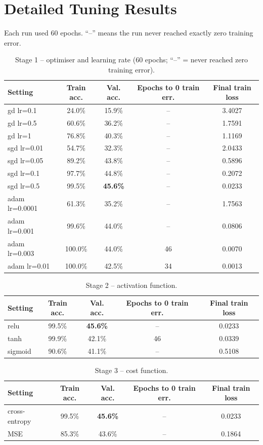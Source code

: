 \documentclass[12pt,a4paper]{article}
\begin{document}
\section{Detailed Tuning Results}\label{sec:tuning}
Each run used 60 epochs. ``--'' means the run never reached exactly zero training error.

\begin{table}[H]\centering\small
\begin{tabular}{lcccc}\toprule
Setting & Train acc. & Val. acc. & Epochs to 0 train err. & Final train loss \\\midrule
gd lr=0.1 & 24.0\% & 15.9\% & -- & 3.4027 \\
gd lr=0.5 & 60.6\% & 36.2\% & -- & 1.7591 \\
gd lr=1 & 76.8\% & 40.3\% & -- & 1.1169 \\
sgd lr=0.01 & 54.7\% & 32.3\% & -- & 2.0433 \\
sgd lr=0.05 & 89.2\% & 43.8\% & -- & 0.5896 \\
sgd lr=0.1 & 97.7\% & 44.8\% & -- & 0.2072 \\
sgd lr=0.5 & 99.5\% & \textbf{45.6\%} & -- & 0.0233 \\
adam lr=0.0001 & 61.3\% & 35.2\% & -- & 1.7563 \\
adam lr=0.001 & 99.6\% & 44.0\% & -- & 0.0806 \\
adam lr=0.003 & 100.0\% & 44.0\% & 46 & 0.0070 \\
adam lr=0.01 & 100.0\% & 42.5\% & 34 & 0.0013 \\
\bottomrule\end{tabular}
\caption{Stage 1 -- optimiser and learning rate (60 epochs; ``--'' = never reached zero training error).}\label{tab:opt}\end{table}
\begin{table}[H]\centering\small
\begin{tabular}{lcccc}\toprule
Setting & Train acc. & Val. acc. & Epochs to 0 train err. & Final train loss \\\midrule
relu & 99.5\% & \textbf{45.6\%} & -- & 0.0233 \\
tanh & 99.9\% & 42.1\% & 46 & 0.0339 \\
sigmoid & 90.6\% & 41.1\% & -- & 0.5108 \\
\bottomrule\end{tabular}
\caption{Stage 2 -- activation function.}\label{tab:act}\end{table}
\begin{table}[H]\centering\small
\begin{tabular}{lcccc}\toprule
Setting & Train acc. & Val. acc. & Epochs to 0 train err. & Final train loss \\\midrule
cross-entropy & 99.5\% & \textbf{45.6\%} & -- & 0.0233 \\
MSE & 85.3\% & 43.6\% & -- & 0.1864 \\
\bottomrule\end{tabular}
\caption{Stage 3 -- cost function.}\label{tab:loss}\end{table}
\end{document}
